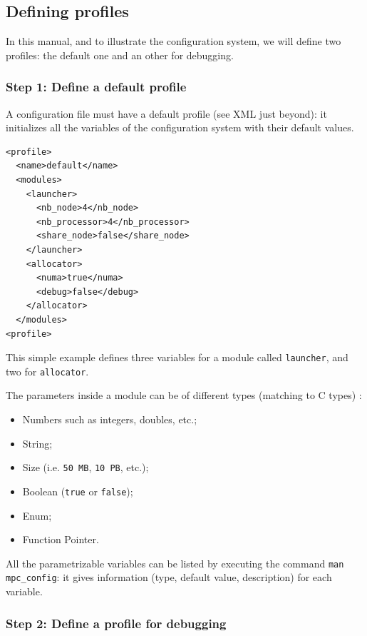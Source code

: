 \documentclass{article}
\begin{document}
\subsection{Defining profiles}

In this manual, and to illustrate the configuration system, we will define two profiles: the default one and an other for debugging.

\subsubsection{Step 1: Define a default profile}

A configuration file must have a default profile (see XML just beyond): it initializes all the variables of the configuration system with their default values.

\lstset{language=XML}
\begin{lstlisting}[title=Example of \texttt{default} profile]
<profile>
  <name>default</name>
  <modules>
    <launcher>
      <nb_node>4</nb_node>
      <nb_processor>4</nb_processor>
      <share_node>false</share_node>
    </launcher>
    <allocator>
      <numa>true</numa>
      <debug>false</debug>
    </allocator>
  </modules>
<profile>
\end{lstlisting}

\noindent This simple example defines three variables for a module called \texttt{launcher}, and two for \texttt{allocator}.
\newline

\noindent The parameters inside a module can be of different types (matching to C types) :
\begin{itemize}
\item Numbers such as integers, doubles, etc.;
\item String;
\item Size (i.e. \texttt{50 MB}, \texttt{10 PB}, etc.);
\item Boolean (\texttt{true} or \texttt{false});
\item Enum;
\item Function Pointer.
\end{itemize}

\noindent All the parametrizable variables can be listed by executing the command \texttt{man mpc\_config}: it gives information (type, default value, description) for each variable.

\subsubsection{Step 2: Define a profile for debugging}
\end{document}

